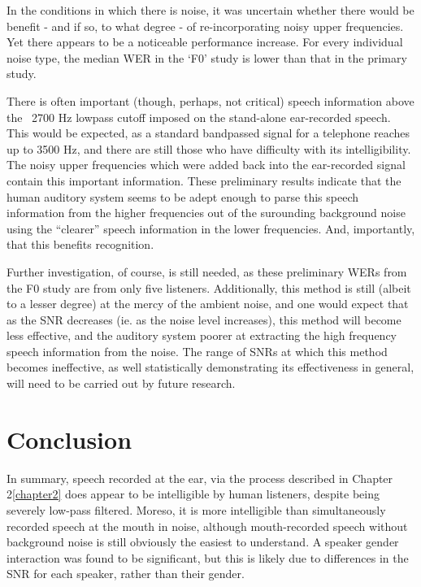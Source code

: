 \documentclass[dissertation,copyright]{uathesis}
\begin{document}
In the conditions in which there is noise, it was uncertain whether there would be benefit - and if so, to what degree - of re-incorporating noisy upper frequencies.  Yet there appears to be a noticeable performance increase.  For every individual noise type, the median WER in the `F0' study is lower than that in the primary study. 

There is often important (though, perhaps, not critical) speech information above the ~2700 Hz lowpass cutoff imposed on the stand-alone ear-recorded speech.  This would be expected, as a standard bandpassed signal for a telephone reaches up to 3500 Hz, and there are still those who have difficulty with its intelligibility.  The noisy upper frequencies which were added back into the ear-recorded signal contain this important information.  These preliminary results indicate that the human auditory system seems to be adept enough to parse this speech information from the higher frequencies out of the surounding background noise using the ``clearer'' speech information in the lower frequencies.  And, importantly, that this benefits recognition.

Further investigation, of course, is still needed, as these preliminary WERs from the F0 study are from only five listeners.  Additionally, this method is still (albeit to a lesser degree) at the mercy of the ambient noise, and one would expect that as the SNR decreases (ie. as the noise level increases), this method will become less effective, and the auditory system poorer at extracting the high frequency speech information from the noise.  The range of SNRs at which this method becomes ineffective, as well statistically demonstrating its effectiveness in general, will need to be carried out by future research.

\section{Conclusion}

In summary, speech recorded at the ear, via the process described in Chapter 2\ref{chapter2} does appear to be intelligible by human listeners, despite being severely low-pass filtered.  Moreso, it is more intelligible than simultaneously recorded speech at the mouth in noise, although mouth-recorded speech without background noise is still obviously the easiest to understand.  A speaker gender interaction was found to be significant, but this is likely due to differences in the SNR for each speaker, rather than their gender.  
\end{document}
